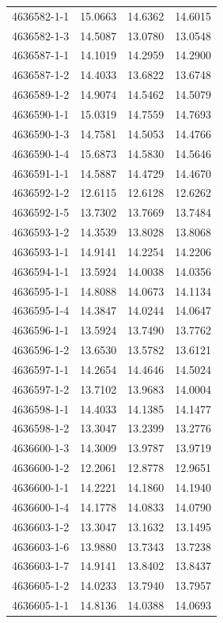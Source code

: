 \begin{longtable}{lrrr}
4636582-1-1 & 15.0663 & 14.6362 & 14.6015 \\
4636582-1-3 & 14.5087 & 13.0780 & 13.0548 \\
4636587-1-1 & 14.1019 & 14.2959 & 14.2900 \\
4636587-1-2 & 14.4033 & 13.6822 & 13.6748 \\
4636589-1-2 & 14.9074 & 14.5462 & 14.5079 \\
4636590-1-1 & 15.0319 & 14.7559 & 14.7693 \\
4636590-1-3 & 14.7581 & 14.5053 & 14.4766 \\
4636590-1-4 & 15.6873 & 14.5830 & 14.5646 \\
4636591-1-1 & 14.5887 & 14.4729 & 14.4670 \\
4636592-1-2 & 12.6115 & 12.6128 & 12.6262 \\
4636592-1-5 & 13.7302 & 13.7669 & 13.7484 \\
4636593-1-2 & 14.3539 & 13.8028 & 13.8068 \\
4636593-1-1 & 14.9141 & 14.2254 & 14.2206 \\
4636594-1-1 & 13.5924 & 14.0038 & 14.0356 \\
4636595-1-1 & 14.8088 & 14.0673 & 14.1134 \\
4636595-1-4 & 14.3847 & 14.0244 & 14.0647 \\
4636596-1-1 & 13.5924 & 13.7490 & 13.7762 \\
4636596-1-2 & 13.6530 & 13.5782 & 13.6121 \\
4636597-1-1 & 14.2654 & 14.4646 & 14.5024 \\
4636597-1-2 & 13.7102 & 13.9683 & 14.0004 \\
4636598-1-1 & 14.4033 & 14.1385 & 14.1477 \\
4636598-1-2 & 13.3047 & 13.2399 & 13.2776 \\
4636600-1-3 & 14.3009 & 13.9787 & 13.9719 \\
4636600-1-2 & 12.2061 & 12.8778 & 12.9651 \\
4636600-1-1 & 14.2221 & 14.1860 & 14.1940 \\
4636600-1-4 & 14.1778 & 14.0833 & 14.0790 \\
4636603-1-2 & 13.3047 & 13.1632 & 13.1495 \\
4636603-1-6 & 13.9880 & 13.7343 & 13.7238 \\
4636603-1-7 & 14.9141 & 13.8402 & 13.8437 \\
4636605-1-2 & 14.0233 & 13.7940 & 13.7957 \\
4636605-1-1 & 14.8136 & 14.0388 & 14.0693 \\

\end{longtable}
